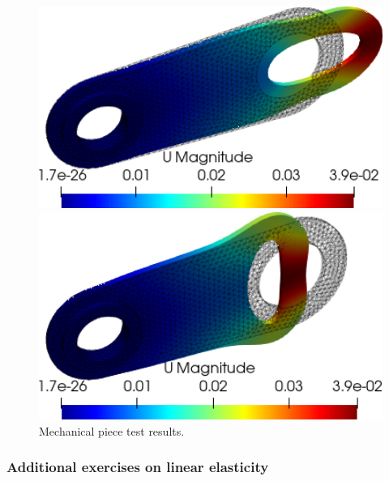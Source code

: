{{\begin{figure}[htbp]
    \centering
    \begin{minipage}{0.42\textwidth}
    \includegraphics[align=b,width=1\textwidth]{./Images/3d-mechanical-result-x.png}
    \end{minipage}\hspace{.1\textwidth}
    \begin{minipage}{0.4\textwidth}
    \includegraphics[align=b,width=1\textwidth]{./Images/3d-mechanical-result--x.png}
    \end{minipage}
    \caption{Mechanical piece test results.}
    \label{fig:mechapieceresult2}
\end{figure}

\subsubsection{Additional exercises on linear elasticity}
}}

